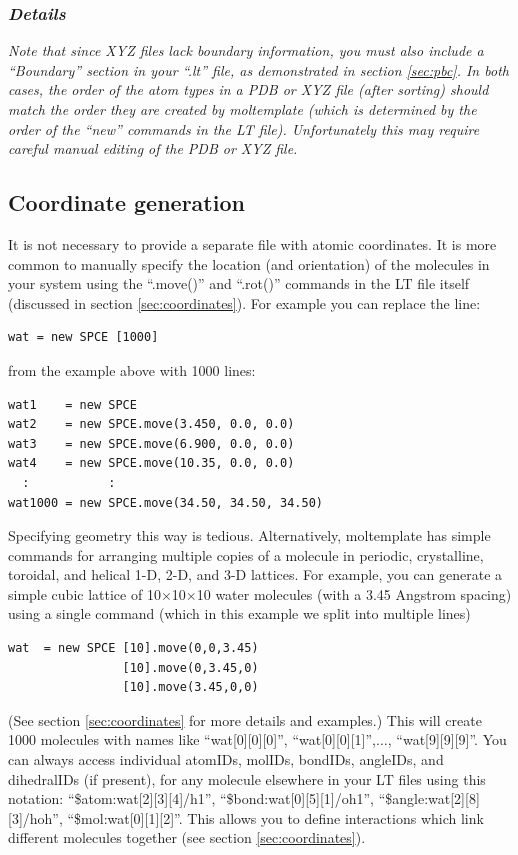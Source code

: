 \documentclass[11pt]{article}
\begin{document}
\subsubsection*{\textit{Details}}
\textit{Note that since XYZ files lack boundary information, you must also 
 include a ``Boundary'' section in your ``.lt'' file, as demonstrated 
 in section \ref{sec:pbc}. 
 In both cases, the order of the atom types in a PDB or XYZ file 
 (after sorting) should match the order they are created by moltemplate
 (which is determined by the order of the ``new'' commands 
 in the LT file). 
 Unfortunately this may require careful manual editing of the PDB or XYZ file.}

\subsection{Coordinate generation}
\label{sec:coords_intro}
It is not necessary to provide a separate file with atomic coordinates. 
It is more common to manually specify the location 
(and orientation) of the molecules in your system using the
 ``.move()'' and ``.rot()'' commands %
in the LT file itself 
(discussed in section \ref{sec:coordinates}).
For example you can replace the line:
\begin{verbatim}
wat = new SPCE [1000]
\end{verbatim}
from the example above with 1000 lines:
\begin{verbatim}
wat1    = new SPCE
wat2    = new SPCE.move(3.450, 0.0, 0.0)
wat3    = new SPCE.move(6.900, 0.0, 0.0)
wat4    = new SPCE.move(10.35, 0.0, 0.0)
  :           :
wat1000 = new SPCE.move(34.50, 34.50, 34.50)
\end{verbatim}
Specifying geometry this way is tedious.
Alternatively, moltemplate has simple commands for arranging multiple 
copies of a molecule in periodic, crystalline, toroidal, and helical 
1-D, 2-D, and 3-D lattices.  
For example, you can generate a simple cubic lattice of 
10$\times$10$\times$10 water molecules
(with a 3.45 Angstrom spacing)
using a single command 
(which in this example we split into multiple lines)
\begin{verbatim}
wat  = new SPCE [10].move(0,0,3.45) 
                [10].move(0,3.45,0) 
                [10].move(3.45,0,0)
\end{verbatim}
(See section \ref{sec:coordinates} for more details and examples.)
This will create 1000 molecules with names like
``wat[0][0][0]'', ``wat[0][0][1]'',$\ldots$, ``wat[9][9][9]''.
You can always access individual atomIDs, molIDs, bondIDs, angleIDs, 
and dihedralIDs (if present), for any molecule 
elsewhere in your LT files using this notation:
``\$atom:wat[2][3][4]/h1'', 
``\$bond:wat[0][5][1]/oh1'', 
``\$angle:wat[2][8][3]/hoh'', 
``\$mol:wat[0][1][2]''.
This allows you to define interactions which link
different molecules together (see section \ref{sec:coordinates}).
\end{document}
